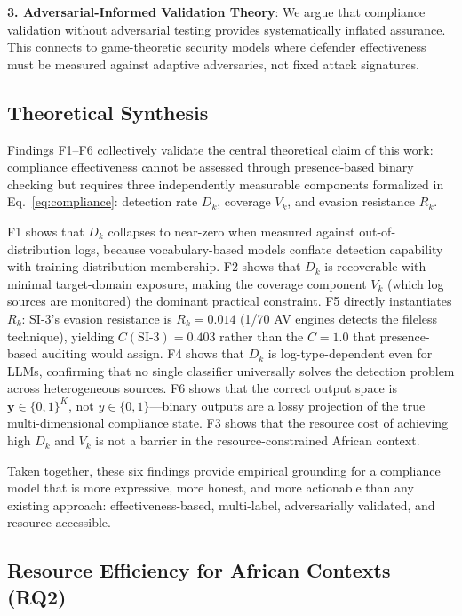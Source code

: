 \documentclass[11pt,conference]{IEEEtran}
\begin{document}
\textbf{3. Adversarial-Informed Validation Theory}: We argue that compliance validation without adversarial testing provides systematically inflated assurance. This connects to game-theoretic security models \cite{mitre_attack_applications} where defender effectiveness must be measured against adaptive adversaries, not fixed attack signatures.

\subsection{Theoretical Synthesis}

Findings F1--F6 collectively validate the central theoretical claim of this work: compliance effectiveness cannot be assessed through presence-based binary checking but requires three independently measurable components formalized in Eq.~\ref{eq:compliance}: detection rate $D_k$, coverage $V_k$, and evasion resistance $R_k$.

F1 shows that $D_k$ collapses to near-zero when measured against out-of-distribution logs, because vocabulary-based models conflate detection capability with training-distribution membership. F2 shows that $D_k$ is recoverable with minimal target-domain exposure, making the coverage component $V_k$ (which log sources are monitored) the dominant practical constraint. F5 directly instantiates $R_k$: SI-3's evasion resistance is $R_k = 0.014$ (1/70 AV engines detects the fileless technique), yielding $C(\text{SI-3}) = 0.403$ rather than the $C = 1.0$ that presence-based auditing would assign. F4 shows that $D_k$ is log-type-dependent even for LLMs, confirming that no single classifier universally solves the detection problem across heterogeneous sources. F6 shows that the correct output space is $\mathbf{y} \in \{0,1\}^K$, not $y \in \{0,1\}$---binary outputs are a lossy projection of the true multi-dimensional compliance state. F3 shows that the resource cost of achieving high $D_k$ and $V_k$ is not a barrier in the resource-constrained African context.

Taken together, these six findings provide empirical grounding for a compliance model that is more expressive, more honest, and more actionable than any existing approach: effectiveness-based, multi-label, adversarially validated, and resource-accessible.

\subsection{Resource Efficiency for African Contexts (RQ2)}
\end{document}
